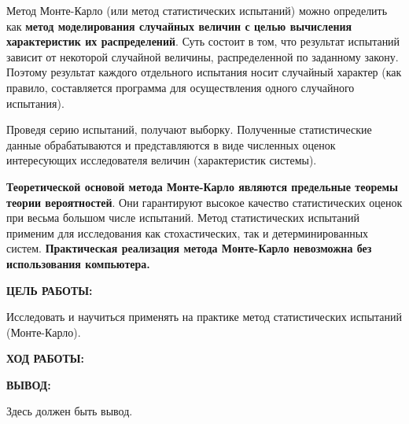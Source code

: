 \documentclass[14pt,a4paper]{extreport}
\newcommand{\header}[1]{%
{
\clearpage%
\fontsize{16pt}{14pt}\selectfont
\begin{center}
\textbf{\MakeUppercase{#1}:}
\end{center}
}
}
\begin{document}
Метод Монте-Карло (или метод статистических испытаний) можно
определить как \textbf{метод моделирования случайных величин с целью
вычисления характеристик их распределений}. Суть состоит в том, что
результат испытаний зависит от некоторой случайной величины, распределенной по заданному закону. Поэтому результат каждого отдельного испытания носит случайный характер (как правило, составляется программа для осуществления одного случайного испытания). \par
Проведя серию испытаний, получают выборку. Полученные статистические данные обрабатываются и представляются в виде численных оценок интересующих исследователя величин (характеристик системы). \par\textbf{Теоретической основой метода Монте-Карло являются предельные
теоремы теории вероятностей}. Они гарантируют высокое качество статистических оценок при весьма большом числе испытаний. Метод статистических испытаний применим для исследования как стохастических, так и детерминированных систем. \textbf{Практическая реализация метода Монте-Карло невозможна без использования компьютера.}

\header{Цель работы}

Исследовать и научиться применять на практике метод статистических испытаний (Монте-Карло).

\header{Ход работы}



\clearpage
\header{Вывод}

Здесь должен быть вывод.
\end{document}
